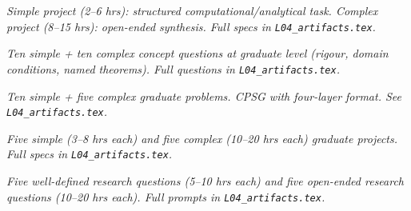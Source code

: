 \begin{tcolorbox}[ugprobbox, title={SPJU + CPJU · L04 · Tiers 2–3}]
\textit{Simple project (2–6 hrs): structured computational/analytical task.
Complex project (8–15 hrs): open-ended synthesis.
Full specs in \texttt{L04_artifacts.tex}.}
\end{tcolorbox}

\begin{tcolorbox}[gradconceptbox, title={SCQG + CCQG · L04 · Tiers 4–5}]
\textit{Ten simple + ten complex concept questions at graduate level (rigour, domain
conditions, named theorems). Full questions in \texttt{L04_artifacts.tex}.}
\end{tcolorbox}

\begin{tcolorbox}[gradprobbox, title={SPSG + CPSG · L04 · Tiers 4–5}]
\textit{Ten simple + five complex graduate problems.
CPSG with four-layer format. See \texttt{L04_artifacts.tex}.}
\end{tcolorbox}

\begin{tcolorbox}[gradprobbox, title={SPJG (×5) + CPJG (×5) · L04 · Tiers 4–5}]
\textit{Five simple (3–8 hrs each) and five complex (10–20 hrs each) graduate projects.
Full specs in \texttt{L04_artifacts.tex}.}
\end{tcolorbox}

\begin{tcolorbox}[researchbox, title={WRQ (×5) + ORQ (×5) · L04 · Tiers 4–5}]
\textit{Five well-defined research questions (5–10 hrs each) and five open-ended
research questions (10–20 hrs each). Full prompts in \texttt{L04_artifacts.tex}.}
\end{tcolorbox}
